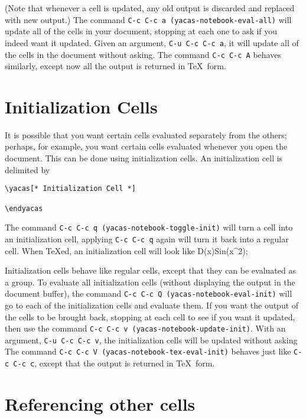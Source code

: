\documentclass[12pt]{article}
\begin{document}
(Note that whenever a cell is updated, any old output is discarded and
replaced with new output.)  The command \texttt{C-c C-c a
(yacas-notebook-eval-all)} will update all of the cells in your document,
stopping at each one to ask if you indeed want it updated.  Given an
argument, \texttt{C-u C-c C-c a}, it will update all of the cells in
the document without asking.  The command \texttt{C-c C-c A} behaves
similarly, except now all the output is returned in \TeX\ form.

\section{Initialization Cells}

It is possible that you want certain cells evaluated separately from
the others; perhaps, for example, you want certain cells evaluated
whenever you open the document.  This can be done using initialization
cells.  An initialization cell is delimited by
\begin{verbatim}
\yacas[* Initialization Cell *]

\endyacas
\end{verbatim}
The command \texttt{C-c C-c q (yacas-notebook-toggle-init)} will turn a cell
into an initialization cell, applying \texttt{C-c C-c q} again will
turn it back into a regular cell.  When \TeX{}ed, an initialization
cell will look like
D(x)Sin(x^2);
\endyacas

Initialization cells behave like regular cells, except that they can
be evaluated as a group.  To evaluate all initialization cells
(without displaying the output in the document buffer), the command
\texttt{C-c C-c Q (yacas-notebook-eval-init)} will go to each of the
initialization cells and evaluate them.  If you want the output of the
cells to be brought back, stopping at each cell to see if you want it
updated, then use the command \texttt{C-c C-c v
  (yacas-notebook-update-init)}.  With an argument, \texttt{C-u C-c C-c v},
the initialization cells will be updated without asking  The command
\texttt{C-c C-c V (yacas-notebook-tex-eval-init)} behaves just like
\texttt{C-c C-c c}, except that the output is returned in \TeX\ form.

\section{Referencing other cells}
\end{document}
